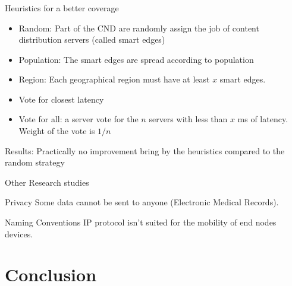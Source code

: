 \documentclass[utf8,xcolor=table, page number]{earlywinter}
\begin{document}
\begin{frame}
  \frametitle{\secname}
  \framesubtitle{\subsecname}

  \begin{exampleblock}{Heuristics for a better coverage}
    \begin{itemize}
      \item Random: Part of the CND are randomly assign the job of content distribution servers (called smart edges)
      \item Population: The smart edges are spread according to population
      \item Region: Each geographical region must have at least $x$ smart edges.
      \item Vote for closest latency
      \item Vote for all: a server vote for the $n$ servers with less than $x$ ms of latency. Weight of the vote is $1/n$
    \end{itemize}
    Results: Practically no improvement bring by the heuristics compared to the random strategy
  \end{exampleblock}
  
\end{frame}

\begin{frame}{Other Research studies} %
  
  \begin{alertblock}{Privacy}
    Some data cannot be sent to anyone (Electronic Medical Records).
  \end{alertblock}

  \begin{alertblock}{Naming Conventions}
    IP protocol isn't suited for the mobility of end nodes devices.
  \end{alertblock}

  
\end{frame}



\section*{Conclusion}
\end{document}
